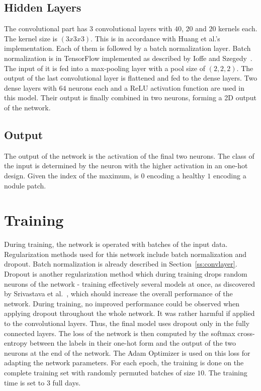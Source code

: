 \documentclass[main.tex]{subfiles}
\begin{document}
\subsection{Hidden Layers}
The convolutional part has $3$ convolutional layers with $40$, $20$ and $20$ kernels each. The kernel size is $(3x3x3)$. This is in accordance with Huang et al.'s~\cite{huang2017lung} implementation. Each of them is followed by a batch normalization layer. Batch normalization is in TensorFlow implemented as described by Ioffe and Szegedy~\cite{ioffe2015batch}. The input of it is fed into a max-pooling layer with a pool size of $(2,2,2)$. The output of the last convolutional layer is flattened and fed to the dense layers. Two dense layers with $64$ neurons each and a ReLU activation function are used in this model. Their output is finally combined in two neurons, forming a 2D output of the network. 


\subsection{Output}
The output of the network is the activation of the final two neurons. The class of the input is determined by the neuron with the higher activation in an one-hot design. Given the index of the maximum, is $0$ encoding a healthy $1$ encoding a nodule patch.


\section{Training}
During training, the network is operated with batches of the input data. Regularization methods used for this network include batch normalization and dropout. Batch normalization is already described in Section~\ref{ss:convlayer}. Dropout is another regularization method which during training drops random neurons of the network - training effectively several models at once, as discovered by Srivastava et al.~\cite{srivastava2014dropout}, which should increase the overall performance of the network. During training, no improved performance could be observed when applying dropout throughout the whole network. It was rather harmful if applied to the convolutional layers. Thus, the final model uses dropout only in the fully connected layers. The loss of the network is then computed by the softmax cross-entropy between the labels in their one-hot form and the output of the two neurons at the end of the network. The Adam Optimizer is used on this loss for adapting the network parameters. For each epoch, the training is done on the complete training set with randomly permuted batches of size $10$. The training time is set to 3 full days.
                                                 
\end{document}
